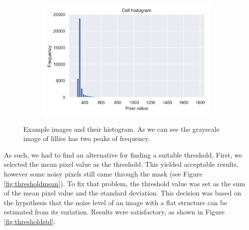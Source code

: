 \begin{figure}[h]
\begin{subfigure}{0.45\textwidth}
    \end{subfigure}
    \begin{subfigure}{0.5\textwidth}
        \centering
        \includegraphics[width=.45\textwidth]{dissertation/figures/cell_histogram.png}
    \end{subfigure}
    \caption{Example images and their histogram. As we can see the grayscale image of lillies has two peaks of frequency.}
    \label{fig:thresholdhist}
\end{figure}
As such, we had to find an alternative for finding a suitable threshold. First, we selected the mean pixel value as the threshold. This yielded acceptable results, however some noisy pixels still came through the mask (see Figure \ref{fig:thresholdmean}). To fix that problem, the threshold value was set as the sum of the mean pixel value and the standard deviation. This decision was based on the hypothesis that the noise level of an image with a flat structure can be estimated from its variation. Results were satisfactory, as shown in Figure \ref{fig:thresholdstd}.

